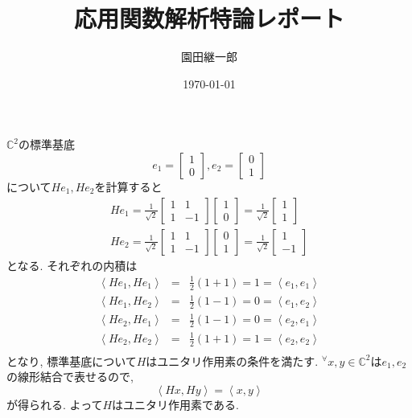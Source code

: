 \documentclass[a4paper,11pt]{jsarticle}
\begin{document}
\title{応用関数解析特論レポート}
\author{園田継一郎}
\date{\today}
\maketitle

\section{}
$\mathbb{C}^2$の標準基底
\[
  e_1 = \begin{bmatrix}
    1 \\ 0
  \end{bmatrix}, 
  e_2 = \begin{bmatrix}
    0 \\ 1
  \end{bmatrix}
\]
について$He_1, He_2$を計算すると
\begin{eqnarray*}
  He_1 = \frac{1}{\sqrt{2}} \begin{bmatrix}
    1 & 1 \\ 1 & -1
  \end{bmatrix} \begin{bmatrix}
    1 \\ 0
  \end{bmatrix} = \frac{1}{\sqrt{2}} \begin{bmatrix}
    1 \\ 1
  \end{bmatrix} \\
  He_2 = \frac{1}{\sqrt{2}} \begin{bmatrix}
    1 & 1 \\ 1 & -1
  \end{bmatrix} \begin{bmatrix}
    0 \\ 1
  \end{bmatrix} = \frac{1}{\sqrt{2}} \begin{bmatrix}
    1 \\ -1
  \end{bmatrix}
\end{eqnarray*}
となる. それぞれの内積は
\begin{eqnarray*}
  \left<He_1, He_1\right>
  &=& \frac{1}{2}(1 + 1) = 1 = \left<e_1, e_1\right> \\
  \left<He_1, He_2\right>
  &=& \frac{1}{2}(1 - 1) = 0 = \left<e_1, e_2\right> \\
  \left<He_2, He_1\right>
  &=& \frac{1}{2}(1 - 1) = 0 = \left<e_2, e_1\right> \\
  \left<He_2, He_2\right>
  &=& \frac{1}{2}(1 + 1) = 1 = \left<e_2, e_2\right> \\
\end{eqnarray*}
となり, 標準基底について$H$はユニタリ作用素の条件を満たす.
${}^\forall x, y \in \mathbb{C}^2$は$e_1, e_2$
の線形結合で表せるので, 
\[
  \left<Hx, Hy\right> = \left<x, y\right>
\]
が得られる. よって$H$はユニタリ作用素である.
\end{document}
